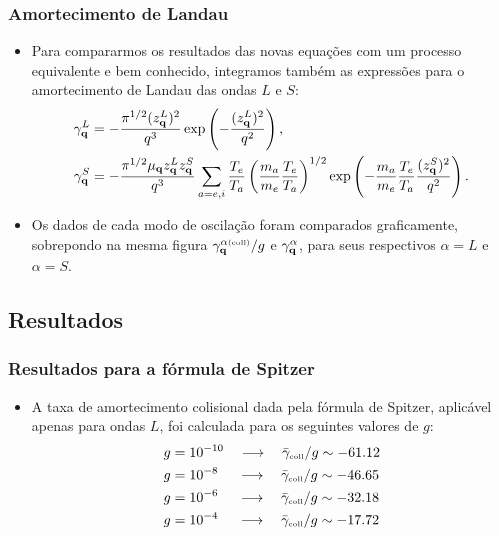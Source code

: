 \documentclass[10pt,aspectratio=1610,lualatex]{beamer}
\begin{document}
\begin{frame}
  \frametitle{Amortecimento de Landau}
  \begin{itemize}
    \item Para compararmos os resultados das novas equações com
    um processo equivalente e bem conhecido, integramos também as
    expressões para o amortecimento de Landau das ondas $L$ e $S$:
    \begin{align*}
       \gamma_{\bf q}^L
      &= -\frac{\pi^{1/2}(z_{\bf q}^L)^2}{q^3}
	  \exp\left(-\frac{(z_{\bf q}^L)^2}{q^2}\right),\\
      \gamma_{\bf q}^S
      &= -\frac{\pi^{1/2}\mu_{\bf q}z_{\bf q}^Lz_{\bf q}^S}{q^3}
	  \sum_{a=e,i}\frac{T_e}{T_a}\left(\frac{m_a}{m_e}
	  \frac{T_e}{T_a}\right)^{1/2}\exp\left(-\frac{m_a}{m_e}
	  \frac{T_e}{T_a}\frac{(z_{\bf q}^S)^2}{q^2}\right).
    \end{align*}
    \vspace{0.2cm}
    \pause
    \item Os dados de cada modo de oscilação foram comparados
    graficamente, sobrepondo na mesma figura
    $\gamma_{\bf q}^{\alpha \mbox{\tiny(coll)}}/g$ e $\gamma_{\bf q}^\alpha$,
    para seus respectivos $\alpha=L$ e $\alpha=S$.
  \end{itemize}
\end{frame}

\subsection*{Resultados}
\begin{frame}
  \frametitle{Resultados para a fórmula de Spitzer}
  \begin{itemize}
    \item A taxa de amortecimento colisional dada pela fórmula de
    Spitzer, aplicável apenas para ondas $L$, foi calculada para os
    seguintes  valores de $g$:
    \begin{align*}
      g&=10^{-10}\quad \longrightarrow \quad
      \bar \gamma_{\mbox{\tiny coll}}/g \sim -61.12\\
      g&=10^{-8}\,\,\quad \longrightarrow \quad
      \bar \gamma_{\mbox{\tiny coll}}/g \sim -46.65\\
      g&=10^{-6}\,\,\quad \longrightarrow \quad
      \bar \gamma_{\mbox{\tiny coll}}/g \sim -32.18\\
      g&=10^{-4}\,\,\quad \longrightarrow \quad
      \bar \gamma_{\mbox{\tiny coll}}/g \sim -17.72\\
    \end{align*}
  \end{itemize}
\end{frame}
\end{document}
